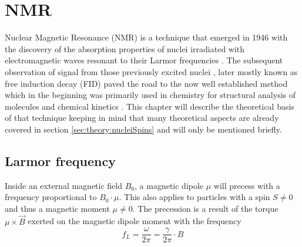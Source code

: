     \section{NMR}
    Nuclear Magnetic Resonance (NMR) is a technique that emerged in 1946 with the discovery of the absorption properties of nuclei irradiated with electromagnetic waves resonant to their Larmor frequencies \cite{purcell_resonance_1946-1}. The subsequent observation of signal from those previously excited nuclei \cite{rabi_space_1937,bloch_nuclear_1946}, later mostly known as free induction decay (FID) paved the road to the now well established method which in the beginning was primarily used in chemistry for structural analysis of molecules and chemical kinetics \cite{perrin_application_1990,lipkind_computer-assisted_1988}. This chapter will describe the theoretical basis of that technique keeping in mind that many theoretical aspects are already covered in section \ref{sec:theory:nucleiSpins} and will only be mentioned briefly. 
        \subsection{Larmor frequency}
        \label{sec:theory:larmorFrequency}
            Inside an external magnetic field $B_0$, a magnetic dipole $\mu$ will precess with a frequency
            proportional to $B_0\cdot \mu$. This also applies to  particles with a spin $S\neq0$ and thus
            a magnetic moment $\mu\neq0$. The precession is a result of the torque $\mu\times\vec B$
            exerted on the magnetic dipole moment with the frequency
            \begin{equation}
                f_L=\frac{\omega}{2\pi} = \frac{\gamma}{2\pi}\cdot B
            \end{equation}
